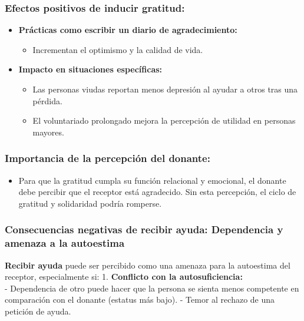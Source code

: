 \documentclass[
]{book}
\providecommand{\tightlist}{%
  \setlength{\itemsep}{0pt}\setlength{\parskip}{0pt}}
\begin{document}
\subsubsection{Efectos positivos de inducir gratitud:}\label{efectos-positivos-de-inducir-gratitud}

\begin{itemize}
\tightlist
\item
  \textbf{Prácticas como escribir un diario de agradecimiento:}

  \begin{itemize}
  \tightlist
  \item
    Incrementan el optimismo y la calidad de vida.
  \end{itemize}
\item
  \textbf{Impacto en situaciones específicas:}

  \begin{itemize}
  \tightlist
  \item
    Las personas viudas reportan menos depresión al ayudar a otros tras una pérdida.
  \item
    El voluntariado prolongado mejora la percepción de utilidad en personas mayores.
  \end{itemize}
\end{itemize}

\subsubsection{Importancia de la percepción del donante:}\label{importancia-de-la-percepciuxf3n-del-donante}

\begin{itemize}
\tightlist
\item
  Para que la gratitud cumpla su función relacional y emocional, el donante debe percibir que el receptor está agradecido. Sin esta percepción, el ciclo de gratitud y solidaridad podría romperse.
\end{itemize}

\subsubsection{Consecuencias negativas de recibir ayuda: Dependencia y amenaza a la autoestima}\label{consecuencias-negativas-de-recibir-ayuda-dependencia-y-amenaza-a-la-autoestima}

\textbf{Recibir ayuda} puede ser percibido como una amenaza para la autoestima del receptor, especialmente si:
1. \textbf{Conflicto con la autosuficiencia:}\\
- Dependencia de otro puede hacer que la persona se sienta menos competente en comparación con el donante (estatus más bajo).
- Temor al rechazo de una petición de ayuda.
\end{document}
